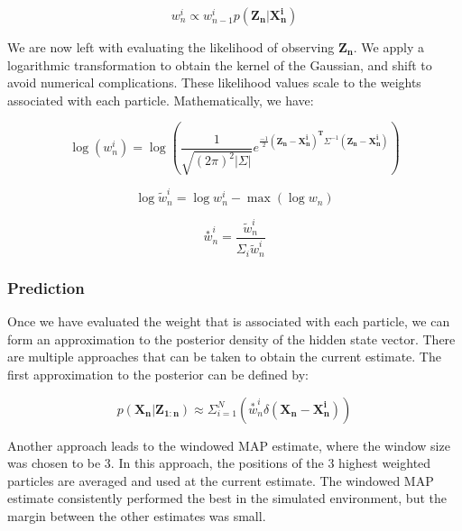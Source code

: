 \documentclass[12pt, a4paper]{article}
\begin{document}
			\begin{equation}
				w_n^i \propto w_{n-1}^i \mathit{p}(\mathbf{Z_n}|\mathbf{X_n^i})
			\end{equation}
 
 			We are now left with evaluating the likelihood of observing $\mathbf{Z_n}$. We apply a logarithmic transformation to obtain the kernel of the Gaussian, and shift to avoid numerical complications. These likelihood values scale to the weights associated with each particle.  Mathematically, we have:

			\begin{equation}
				\log(w_n^i) = \log(\frac{1}{\sqrt{(2 \pi)^2 |\Sigma|}} e^{\frac{-1}{2} \mathbf{(Z_n - X_n^i)^T} \Sigma^{-1} \mathbf{(Z_n - X_n^i)}} )
			\end{equation}

			\begin{equation}
				\log{\tilde{w}_n^i} = \log{w_n^i} - \max{(\log{w_n})}
			\end{equation}		

			\begin{equation}
				\overset{*}{w}_n^i = \frac{\tilde{w}_n^i}{\Sigma_i \tilde{w}_n^i}
			\end{equation}



		\subsubsection{Prediction}
			Once we have evaluated the weight that is associated with each particle, we can form an approximation to the posterior density of the hidden state vector. There are multiple approaches that can be taken to obtain the current estimate. The first approximation to the posterior can be defined by:

			\begin{equation}
				\mathit{p}(\mathbf{X_n | Z_{1:n}}) \approx \Sigma_{i=1}^{N} (\overset{*}{w}_n^i \delta(\mathbf{X_n - X_n^i}))
			\end{equation}

			Another approach leads to the windowed MAP estimate, where the window size was chosen to be 3. In this approach, the positions of the 3 highest weighted particles are averaged and used at the current estimate.  The windowed MAP estimate consistently performed the best in the simulated environment, but the margin between the other estimates was small.
\end{document}
